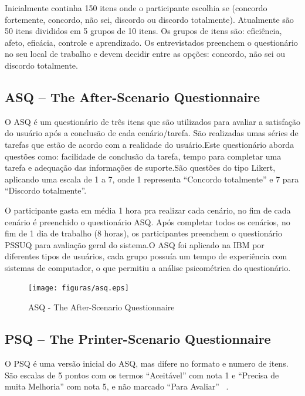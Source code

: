 	Inicialmente continha 150 itens onde o participante escolhia se (concordo fortemente, concordo, não sei, discordo ou discordo totalmente). Atualmente são 50 itens divididos em 5 grupos de 10 itens. Os grupos de itens são: eficiência, afeto, eficácia, controle e aprendizado. Os entrevistados preenchem o questionário no seu local de trabalho e devem decidir entre as opções: concordo, não sei ou discordo totalmente.

\subsection{ASQ – The After-Scenario Questionnaire}

O ASQ é um questionário de três itens que são utilizados para avaliar a satisfação do usuário após a conclusão de cada cenário/tarefa. São realizadas umas séries de tarefas que estão de acordo com a realidade do usuário.Este questionário aborda questões como: facilidade de conclusão da tarefa, tempo para completar uma tarefa e adequação das informações de suporte.São questões do tipo Likert, aplicando uma escala de 1 a 7, onde 1 representa “Concordo totalmente” e 7 para “Discordo totalmente”. ~\cite{lewis1995ibm}

O participante gasta em média 1 hora pra realizar cada cenário, no fim de cada cenário é preenchido o questionário ASQ. Após completar todos os cenários, no fim de 1 dia de trabalho (8 horas), os participantes preenchem o questionário PSSUQ para avaliação geral do sistema.O ASQ foi aplicado na IBM por diferentes tipos de usuários, cada grupo possuía um tempo de experiência com sistemas de computador, o que permitiu a análise psicométrica do questionário.

\begin{figure}[!h]
    \centering
    \texttt{[image: figuras/asq.eps]}
    \label{ASQ - The After-Scenario Questionnaire }
	\caption{ASQ - The After-Scenario Questionnaire}
\end{figure}

\subsection{PSQ – The Printer-Scenario Questionnaire}

O PSQ  é uma versão inicial do ASQ, mas difere no formato e numero de itens.  São escalas de 5 pontos com os termos “Aceitável” com nota 1 e “Precisa de muita Melhoria” com nota 5, e não marcado “Para Avaliar” ~\cite{lewis1995ibm}.

